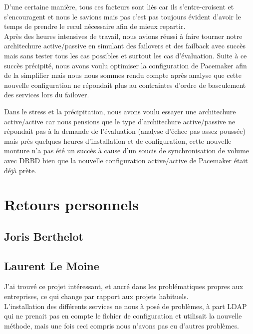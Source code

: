 \documentclass[11pt,a4paper]{report}
\begin{document}
            D'une certaine manière, tous ces facteurs sont liés car ils s'entre-croisent et s'encouragent et nous le savions mais pas c'est pas toujours évident d'avoir le temps de prendre le recul nécessaire afin de mieux repartir.\\
            
            Après des heures intensives de travail, nous avions réussi à faire tourner notre architechure active/passive en simulant des failovers et des failback avec succès mais sans tester tous les cas possibles et surtout les cas d'évaluation. Suite à ce succès précipité, nous avons voulu optimiser la configuration de Pacemaker afin de la simplifier mais nous nous sommes rendu compte après analyse que cette nouvelle configuration ne répondait plus au contraintes d'ordre de basculement des services lors du failover.
            
            Dans le stress et la précipitation, nous avons voulu essayer une architechure active/active car nous pensions que le type d'architechure active/passive ne répondait pas à la demande de l'évaluation (analyse d'échec pas assez poussée) mais près quelques heures d'installation et de configuration, cette nouvelle monture n'a pas été un succès à cause d'un soucis de synchronisation de volume avec DRBD bien que la nouvelle configuration active/active de Pacemaker était déjà prète.
            
        \section{Retours personnels}

            \subsection{Joris Berthelot}

                

            \subsection{Laurent Le Moine}

                J'ai trouv\'e ce projet int\'eressant, et ancr\'e dans les probl\'ematiques propres aux entreprises, ce qui change par rapport aux projets habituels.\\
                
                L'installation des diff\'erents services ne nous \`a pos\'e de probl\`emes, \`a part LDAP qui ne prenait pas en compte le fichier de configuration et utilisait la nouvelle m\'ethode, mais une fois ceci compris nous n'avons pas eu d'autres probl\`emes.\\
                
\end{document}
